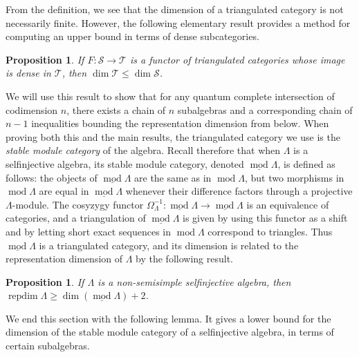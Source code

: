\documentclass[a4paper]{amsart}
\newtheorem{proposition}[theorem]{Proposition}
\theoremstyle{definition}
\theoremstyle{definition}
\theoremstyle{definition}
\theoremstyle{definition}
\theoremstyle{definition}
\theoremstyle{definition}
\theoremstyle{remark}
\theoremstyle{remark}
\theoremstyle{definition}
\theoremstyle{definition}
\begin{document}
From the definition, we see that the dimension of a triangulated
category is not necessarily finite. However, the following
elementary result provides a method for computing an upper bound in
terms of dense subcategories.

\begin{proposition}\cite[Lemma 3.4]{Rouquier1}\label{densesubcat}
If $F \colon \mathcal{S} \to \mathcal{T}$ is a functor of
triangulated categories whose image is dense in $\mathcal{T}$, then
$\dim \mathcal{T} \le \dim \mathcal{S}$.
\end{proposition}

We will use this result to show that for any quantum complete
intersection of codimension $n$, there exists a chain of $n$
subalgebras and a corresponding chain of $n-1$ inequalities bounding
the representation dimension from below. When proving both this and
the main results, the triangulated category we use is the
\emph{stable module category} of the algebra. Recall therefore that
when $\Lambda$ is a selfinjective algebra, its stable module
category, denoted $\underline{\operatorname{mod}\nolimits} \Lambda$, is defined as follows:
the objects of $\underline{\operatorname{mod}\nolimits} \Lambda$ are the same as in ${\operatorname{mod}\nolimits}
\Lambda$, but two morphisms in ${\operatorname{mod}\nolimits} \Lambda$ are equal in
$\underline{\operatorname{mod}\nolimits} \Lambda$ whenever their difference factors through
a projective $\Lambda$-module. The cosyzygy functor
$\Omega_{\Lambda}^{-1} \colon \underline{\operatorname{mod}\nolimits} \Lambda \to
\underline{\operatorname{mod}\nolimits} \Lambda$ is an equivalence of categories, and a
triangulation of $\underline{\operatorname{mod}\nolimits} \Lambda$ is given by using this
functor as a shift and by letting short exact sequences in ${\operatorname{mod}\nolimits}
\Lambda$ correspond to triangles. Thus $\underline{\operatorname{mod}\nolimits} \Lambda$ is
a triangulated category, and its dimension is related to the
representation dimension of $\Lambda$ by the following result.

\begin{proposition}\cite[Proposition 3.7]{Rouquier2}\label{lowerbound}
If $\Lambda$ is a non-semisimple selfinjective algebra, then
${\operatorname{repdim}\nolimits} \Lambda \ge \dim ( \underline{\operatorname{mod}\nolimits} \Lambda ) +2$.
\end{proposition}

We end this section with the following lemma. It gives a lower bound
for the dimension of the stable module category of a selfinjective
algebra, in terms of certain subalgebras.
\end{document}

